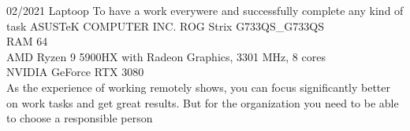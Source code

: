 

\begin{entrylist}
    \entry
    {02/2021}
    {Laptoop}
    {To have a work everywere and successfully complete any kind of task}
    {
        ASUSTeK COMPUTER INC. ROG Strix G733QS\_G733QS             \\
        RAM 64                                                     \\
        AMD Ryzen 9 5900HX with Radeon Graphics, 3301 MHz, 8 cores \\
    NVIDIA GeForce RTX 3080                                    \\

    As the experience of working remotely shows, you can focus significantly better on work tasks and get great results.
    But for the organization you need to be able to choose a responsible person
    }
\end{entrylist}

